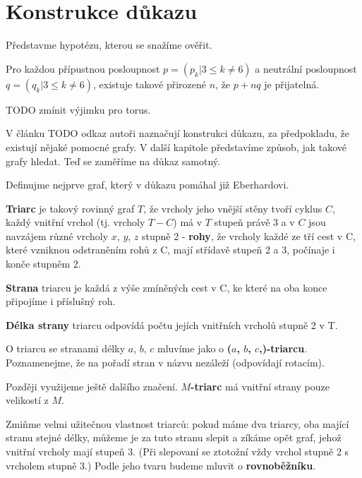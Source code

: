 
\chapter{Konstrukce důkazu}

Představme hypotézu, kterou se snažíme ověřit.
\begin{veta}\label{vera02:1}
Pro každou přípustnou posloupnost $p=(p_k | 3 \leq k \neq 6)$ a neutrální posloupnost $q=(q_k | 3 \leq k \neq 6)$, existuje takové přirozené $n$, že $p+nq$ je přijatelná.
\end{veta}

TODO zmínit výjimku pro torus.

V článku TODO odkaz autoři naznačují konstrukci důkazu, za předpokladu, že existují nějaké pomocné grafy. V další kapitole představíme způsob, jak takové grafy hledat. Teď se zaměříme na důkaz samotný.

Definujme nejprve graf, který v důkazu pomáhal již Eberhardovi.

\begin{definice}[Triarc]\label{def02:1}
\textbf{Triarc} je takový rovinný graf $T$, že vrcholy jeho vnější stěny tvoří cyklus $C$, každý vnitřní vrchol (tj. vrcholy $T-C$) má v $T$ stupeň právě 3 a v $C$ jsou navzájem různé vrcholy $x$, $y$, $z$ stupně 2 - \textbf{rohy}, že vrcholy každé ze tří cest v C, které vzniknou odstraněním rohů z C, mají střídavě stupeň 2 a 3, počínaje i konče stupněm 2.

\textbf{Strana} triarcu je každá z výše zmíněných cest v C, ke které na oba konce připojíme i příslušný roh.

\textbf{Délka strany} triarcu odpovídá počtu jejích vnitřních vrcholů stupně 2 v T.

O triarcu se stranami délky $a$, $b$, $c$ mluvíme jako o \textbf{($a$, $b$, $c$,)-triarcu}. Poznamenejme, že na pořadí stran v názvu nezáleží (odpovídají rotacím).

Později využijeme ještě dalšího značení. \textbf{$M$-triarc} má vnitřní strany pouze velikostí z $M$.
\end{definice}

Zmiňme velmi užitečnou vlastnost triarců: pokud máme dva triarcy, oba mající stranu stejné délky, můžeme je za tuto stranu slepit a zíkáme opět graf, jehož vnitřní vrcholy mají stupeň 3. (Při slepovaní se ztotožní vždy vrchol stupně 2 s vrcholem stupně 3.) Podle jeho tvaru budeme mluvit o \textbf{rovnoběžníku}.

